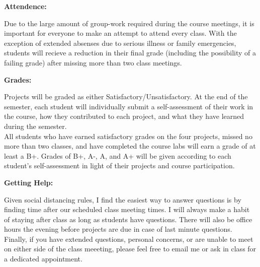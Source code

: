 \documentclass[12pt, a4paper]{article}
\begin{document}
\vspace{12pt}

\textbf{Attendence:} \vspace{6pt}

Due to the large amount of group-work required during the course meetings, it is
important for everyone to make an attempt to attend every class. With the
exception of extended absenses due to serious illness or family emergencies,
students will recieve a reduction in their final grade (including the
possibility of a failing grade) after missing more than two class meetings.

\vspace{12pt}

\textbf{Grades:} \vspace{6pt}

Projects will be graded as either Satisfactory/Unsatisfactory. At the end of
the semester, each student will individually submit a self-assessment of their
work in the course, how they contributed to each project, and what they have
learned during the semester.\\

All students who have earned satisfactory grades on the four projects, missed
no more than two classes, and have completed the course labs will earn a grade
of at least a B+. Grades of B+, A-, A, and A+ will be given according to each
student's self-assessment in light of their projects and course participation.

\vspace{12pt}

\textbf{Getting Help:} \vspace{6pt}

Given social distancing rules, I find the easiest way to answer questions
is by finding time after our scheduled class meeting times. I will always make
a habit of staying after class as long as students have questions. There will
also be office hours the evening before projects are due in case of last minute
questions. Finally, if you have extended questions, personal concerns, or are
unable to meet on either side of the class meeeting, please feel free to email
me or ask in class for a dedicated appointment.
\end{document}
